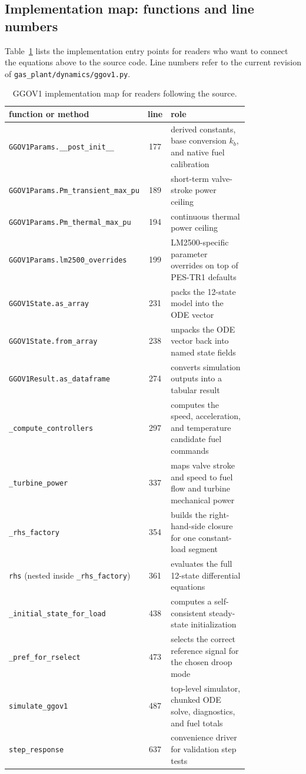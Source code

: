 \documentclass[11pt]{article}
\begin{document}
\subsection{Implementation map: functions and line numbers}
Table~\ref{tab:ggov-code-map} lists the implementation entry points for
readers who want to connect the equations above to the source code.
Line numbers refer to the current revision of
\texttt{gas\_plant/dynamics/ggov1.py}.

\begin{table}[h]
\centering
\footnotesize
\begin{tabular}{p{0.38\linewidth}cp{0.43\linewidth}}
\toprule
function or method & line & role \\
\midrule
\texttt{GGOV1Params.\_\_post\_init\_\_} & 177 & derived constants, base conversion $k_b$, and native fuel calibration \\
\texttt{GGOV1Params.Pm\_transient\_max\_pu} & 189 & short-term valve-stroke power ceiling \\
\texttt{GGOV1Params.Pm\_thermal\_max\_pu} & 194 & continuous thermal power ceiling \\
\texttt{GGOV1Params.lm2500\_overrides} & 199 & LM2500-specific parameter overrides on top of PES-TR1 defaults \\
\texttt{GGOV1State.as\_array} & 231 & packs the 12-state model into the ODE vector \\
\texttt{GGOV1State.from\_array} & 238 & unpacks the ODE vector back into named state fields \\
\texttt{GGOV1Result.as\_dataframe} & 274 & converts simulation outputs into a tabular result \\
\texttt{\_compute\_controllers} & 297 & computes the speed, acceleration, and temperature candidate fuel commands \\
\texttt{\_turbine\_power} & 337 & maps valve stroke and speed to fuel flow and turbine mechanical power \\
\texttt{\_rhs\_factory} & 354 & builds the right-hand-side closure for one constant-load segment \\
\texttt{rhs} (nested inside \texttt{\_rhs\_factory}) & 361 & evaluates the full 12-state differential equations \\
\texttt{\_initial\_state\_for\_load} & 438 & computes a self-consistent steady-state initialization \\
\texttt{\_pref\_for\_rselect} & 473 & selects the correct reference signal for the chosen droop mode \\
\texttt{simulate\_ggov1} & 487 & top-level simulator, chunked ODE solve, diagnostics, and fuel totals \\
\texttt{step\_response} & 637 & convenience driver for validation step tests \\
\bottomrule
\end{tabular}
\caption{GGOV1 implementation map for readers following the source.}
\label{tab:ggov-code-map}
\end{table}
\end{document}
